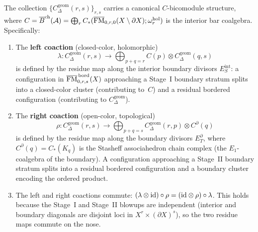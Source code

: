 \begin{theorem}
\label{thm:bordered-bicomodule}
The collection $\{C_\Delta^{\mathrm{geom}}(r,s)\}_{r,s}$ carries a
canonical $C$-bicomodule structure, where
$C=\overline{B}^{\mathrm{ch}}(\mathcal{A})=\bigoplus_r C_*(
\overline{\mathrm{FM}}_{0,r,0}(X\setminus\partial X);\omega^{\mathrm{hol}}_r)$
is the interior bar coalgebra. Specifically:

\begin{enumerate}[label=(\alph*)]
\item The \textbf{left coaction}
 (closed-color, holomorphic)
 \[
 \lambda\colon
 C_\Delta^{\mathrm{geom}}(r,s)
 \longrightarrow
 \bigoplus_{p+q=r}
 C(p)\otimes C_\Delta^{\mathrm{geom}}(q,s)
 \]
 is defined by the residue map along the interior boundary
 divisors $E_S^{\mathrm{int}}$: a configuration in
 $\overline{\mathrm{FM}}^{\,\mathrm{bord}}_{0,r,s}(X)$ approaching a
 Stage~I boundary stratum splits into a closed-color cluster
 (contributing to~$C$) and a residual bordered configuration
 (contributing to $C_\Delta^{\mathrm{geom}}$).

\item The \textbf{right coaction}
 (open-color, topological)
 \[
 \rho\colon
 C_\Delta^{\mathrm{geom}}(r,s)
 \longrightarrow
 \bigoplus_{p+q=s}
 C_\Delta^{\mathrm{geom}}(r,p)\otimes C^{\partial}(q)
 \]
 is defined by the residue map along the boundary divisors
 $E_T^{\partial}$, where
 $C^{\partial}(q)=C_*(K_q)$ is the Stasheff associahedron
 chain complex (the $E_1$-coalgebra of the boundary).
 A configuration approaching a Stage~II boundary stratum splits
 into a residual bordered configuration and a boundary cluster
 encoding the ordered product.

\item The left and right coactions commute:
 $(\lambda\otimes\mathrm{id})\circ\rho
 =(\mathrm{id}\otimes\rho)\circ\lambda$.
 This holds because the Stage~I and Stage~II blowups are
 independent (interior and boundary diagonals are disjoint
 loci in $X^r\times(\partial X)^s$), so the two residue maps
 commute on the nose.
\end{enumerate}
\end{theorem}

